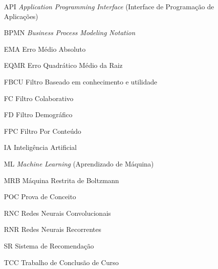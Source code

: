 \begin{siglas}
  \item[API] \textit{Application Programming Interface} (Interface de Programação de Aplicações)
  \item[BPMN] \textit{Business Process Modeling Notation}
  \item[EMA] Erro Médio Absoluto
  \item[EQMR] Erro Quadrático Médio da Raiz
  \item[FBCU] Filtro Baseado em conhecimento e utilidade
  \item[FC] Filtro Colaborativo
  \item[FD] Filtro Demográfico
  \item[FPC] Filtro Por Conteúdo
  \item[IA] Inteligência Artificial
  \item[ML] \textit{Machine Learning} (Aprendizado de Máquina)
  \item[MRB] Máquina Restrita de Boltzmann
  \item[POC] Prova de Conceito
  \item[RNC] Redes Neurais Convolucionais
  \item[RNR] Redes Neurais Recorrentes
  \item[SR] Sistema de Recomendação
  \item[TCC] Trabalho de Conclusão de Curso
\end{siglas}
